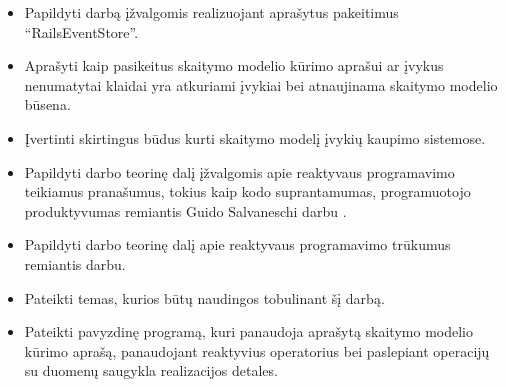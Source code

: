 \begin{itemize}
  \item Papildyti darbą įžvalgomis realizuojant aprašytus pakeitimus ``RailsEventStore''.

  \item Aprašyti kaip pasikeitus skaitymo modelio kūrimo aprašui ar įvykus nenumatytai klaidai yra atkuriami įvykiai bei atnaujinama skaitymo modelio būsena.

  \item Įvertinti skirtingus būdus kurti skaitymo modelį įvykių kaupimo sistemose.

  \item Papildyti darbo teorinę dalį įžvalgomis apie reaktyvaus programavimo teikiamus pranašumus, tokius kaip kodo suprantamumas, programuotojo produktyvumas remiantis Guido Salvaneschi darbu \cite{Salvaneschi:2014:ESP:2635868.2635895}.

  \item Papildyti darbo teorinę dalį apie reaktyvaus programavimo trūkumus remiantis \cite{Bainomugisha:2013:SRP:2501654.2501666} darbu.

  \item Pateikti temas, kurios būtų naudingos tobulinant šį darbą.

  \item Pateikti pavyzdinę programą, kuri panaudoja aprašytą skaitymo modelio kūrimo aprašą, panaudojant reaktyvius operatorius bei paslepiant operacijų su duomenų saugykla realizacijos detales.
\end{itemize}
